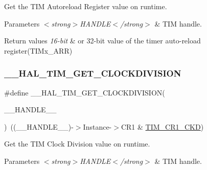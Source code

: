 Get the T\+IM Autoreload Register value on runtime. 


\begin{DoxyParams}{Parameters}
{\em $<$strong$>$\+H\+A\+N\+D\+L\+E$<$/strong$>$} & T\+IM handle. \\
\hline
\end{DoxyParams}

\begin{DoxyRetVals}{Return values}
{\em 16-\/bit} & or 32-\/bit value of the timer auto-\/reload register(\+T\+I\+Mx\+\_\+\+A\+R\+R) \\
\hline
\end{DoxyRetVals}
\mbox{\label{group___t_i_m___exported___macros_gae6bc91bb5940bce52828c690f24001b8}} 
\subsubsection{\texorpdfstring{\_\_HAL\_TIM\_GET\_CLOCKDIVISION}{\_\_HAL\_TIM\_GET\_CLOCKDIVISION}}
{\footnotesize\ttfamily \#define \+\_\+\+\_\+\+H\+A\+L\+\_\+\+T\+I\+M\+\_\+\+G\+E\+T\+\_\+\+C\+L\+O\+C\+K\+D\+I\+V\+I\+S\+I\+ON(\begin{DoxyParamCaption}\item[{}]{\+\_\+\+\_\+\+H\+A\+N\+D\+L\+E\+\_\+\+\_\+ }\end{DoxyParamCaption})~((\+\_\+\+\_\+\+H\+A\+N\+D\+L\+E\+\_\+\+\_\+)-\/$>$Instance-\/$>$C\+R1 \& \mbox{\hyperlink{group___peripheral___registers___bits___definition_gacacc4ff7e5b75fd2e4e6b672ccd33a72}{T\+I\+M\+\_\+\+C\+R1\+\_\+\+C\+KD}})}



Get the T\+IM Clock Division value on runtime. 


\begin{DoxyParams}{Parameters}
{\em $<$strong$>$\+H\+A\+N\+D\+L\+E$<$/strong$>$} & T\+IM handle. \\
\hline
\end{DoxyParams}

